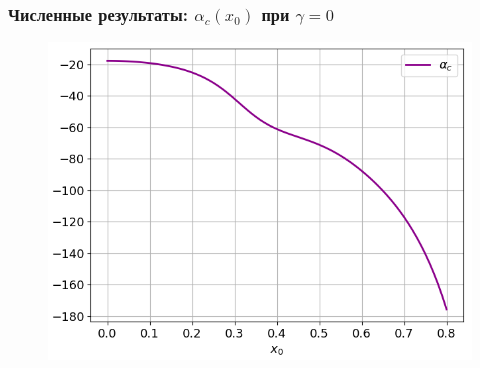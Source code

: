 \documentclass[fullscreen=true, unicode, bookmarks=false]{beamer}
\begin{document}
\begin{frame}
\frametitle{ Численные результаты: $ \alpha_c(x_0) $ при $ \gamma = 0 $ }

\begin{figure} 
\includegraphics[scale=0.65]{origins.png}  
\end{figure}

\end{frame}
\end{document}
